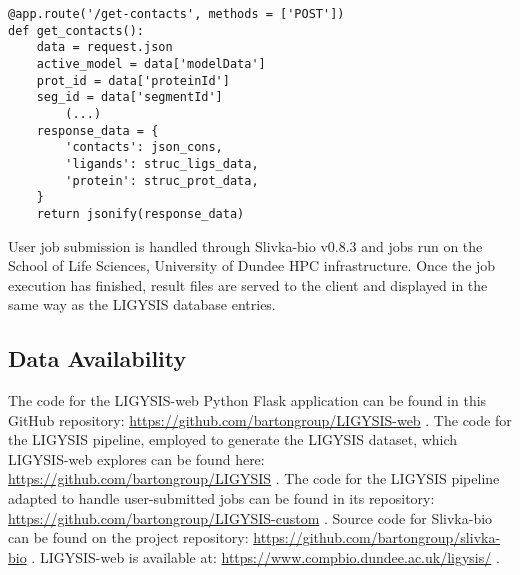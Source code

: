 \begin{lstlisting}[language=MyPython, abovecaptionskip=\abovecaptionskip, caption={[Python Flask \texttt{/get-contacts} route]\textbf{Python Flask \texttt{/get-contacts} route.} Simplified \texttt{/get-contacts} Python Flask route implemented in LIGYSIS-web. This route retrieves the PDB code (\texttt{modelData}) for a given structure depicting the interaction between one or multiple ligands and a protein mapping to a UniProt accession (\texttt{proteinId}) and a PDBe-KB segment (\texttt{segmentId}). Then, it reads a series of files, including pdbe-arpeggio output, processes them and returns the data in a suitable format to draw the relevant protein-ligand interactions in the 3Dmol.js viewer.}, label={get_contacts_route}]
@app.route('/get-contacts', methods = ['POST'])
def get_contacts():
    data = request.json
    active_model = data['modelData']
    prot_id = data['proteinId']
    seg_id = data['segmentId']
		(...)	
    response_data = {
        'contacts': json_cons,
        'ligands': struc_ligs_data,
        'protein': struc_prot_data,
    }
    return jsonify(response_data)
\end{lstlisting}



User job submission is handled through Slivka-bio v0.8.3 \cite{WAROWNY_2021_SLIVKA, SLIVKA_BIO} and jobs run on the School of Life Sciences, University of Dundee HPC infrastructure. Once the job execution has finished, result files are served to the client and displayed in the same way as the LIGYSIS database entries.

\subsection{Data Availability}

The code for the LIGYSIS-web Python Flask application can be found in this GitHub repository: \url{https://github.com/bartongroup/LIGYSIS-web} \cite{UTGES_2024_LIGYSIS_WEB_ZENODO}. The code for the LIGYSIS pipeline, employed to generate the LIGYSIS dataset, which LIGYSIS-web explores can be found here: \url{https://github.com/bartongroup/LIGYSIS} \cite{UTGES_2024_LIGYSIS_ZENODO}. The code for the LIGYSIS pipeline adapted to handle user-submitted jobs can be found in its repository: \url{https://github.com/bartongroup/LIGYSIS-custom} \cite{UTGES_2024_LIGYSIS_CUSTOM_ZENODO}. Source code for Slivka-bio can be found on the project repository:  \url{https://github.com/bartongroup/slivka-bio} \cite{MACGOWAN_2020_DRSASP}. LIGYSIS-web is available at: \url{https://www.compbio.dundee.ac.uk/ligysis/} \cite{LIGYSIS_SERVER}.

